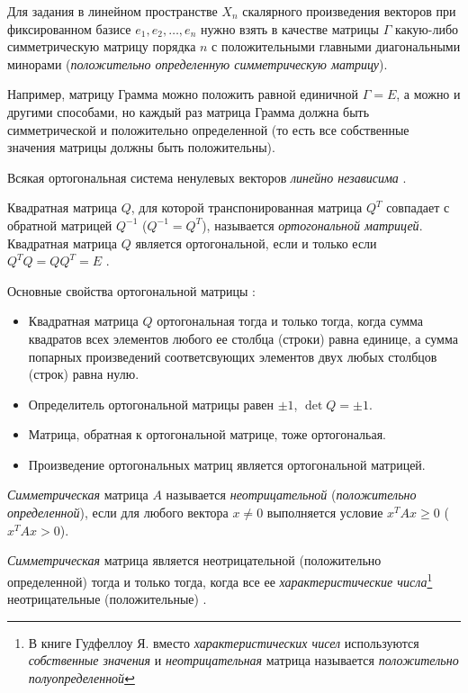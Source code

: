 \documentclass[%
	11pt,
	a4paper,
	utf8,
		]{article}
\begin{document}
Для задания в линейном пространстве $ X_n $ скалярного произведения векторов при фиксированном базисе  $ e_1, e_2, \ldots, e_n $ нужно взять в качестве матрицы $ \Gamma $ какую-либо симметрическую матрицу порядка $ n $ с положительными главными диагональными минорами (\emph{положительно определенную симметрическую матрицу}). 

Например, матрицу Грамма можно положить равной единичной $ \Gamma = E $, а можно и другими способами, но каждый раз матрица Грамма должна быть симметрической и положительно определенной (то есть все собственные значения матрицы должны быть положительны).

Всякая ортогональная система ненулевых векторов \emph{линейно независима} \cite[]{shevtsov:linal-2012}.

Квадратная матрица $ Q $, для которой транспонированная  матрица $ Q^T $ совпадает с обратной матрицей $ Q^{-1} $ ($ Q^{-1} = Q^T $), называется \emph{ортогональной матрицей}. Квадратная матрица $ Q $ является ортогональной, если и только если $ Q^T Q = Q Q^T = E $ \cite[]{shevtsov:linal-2012}.

Основные свойства ортогональной матрицы \cite[]{shevtsov:linal-2012}:
\begin{itemize}
	\item Квадратная матрица $ Q $ ортогональная тогда и только тогда, когда сумма квадратов всех элементов любого ее столбца (строки) равна единице, а сумма попарных произведений соответсвующих элементов двух любых столбцов (строк) равна нулю.
	
	\item Определитель ортогональной матрицы равен $ \pm 1 $, $ \det Q = \pm 1 $.
	
	\item Матрица, обратная к ортогональной матрице, тоже ортогональая.
	
	\item Произведение ортогональных матриц является ортогональной матрицей.
\end{itemize}

\emph{Симметрическая} матрица $ A $ называется \emph{неотрицательной} (\emph{положительно определенной}), если для любого вектора $ x \neq 0 $ выполняется условие $ x^T A x \geqslant 0 $ ($ x^T A x > 0 $).

\emph{Симметрическая} матрица является неотрицательной (положительно определенной) тогда и только тогда, когда все ее \emph{характеристические числа}\footnote{В книге Гудфеллоу Я. \cite[]{goodfellow:ml-2018} вместо \emph{характеристических чисел} используются \emph{собственные значения} и \emph{неотрицательная} матрица называется \emph{положительно полуопределенной}} неотрицательные (положительные) \cite[]{shevtsov:linal-2012}.
\end{document}
